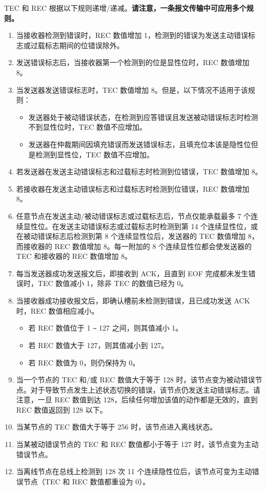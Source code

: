 \documentclass[main\_\_CN.tex]{subfiles}
\begin{document}
TEC 和 REC 根据以下规则递增/递减。\textbf{请注意，一条报文传输中可应用多个规则。}

\begin{enumerate}
    \item 当接收器检测到错误时，REC 数值增加 1，检测到的错误为发送主动错误标志或过载标志期间的位错误除外。
    \item 发送错误标志后，当接收器第一个检测到的位是显性位时，REC 数值增加 8。
    \item 当发送器发送错误标志时，TEC 数值增加 8。但是，以下情况不适用于该规则：
    \begin{itemize}
        \item 发送器处于被动错误状态，在检测到应答错误且发送被动错误标志时检测不到显性位时，TEC 数值不应增加。
        \item 发送器在仲裁期间因填充错误而发送错误标志，且填充位本该是隐性位但是检测到显性位，TEC 数值不应增加。
    \end{itemize}
    \item 若发送器在发送主动错误标志和过载标志时检测到位错误，TEC 数值增加 8。
    \item 若接收器在发送主动错误标志和过载标志时检测到位错误，REC 数值增加 8。
    \item 任意节点在发送主动/被动错误标志或过载标志后，节点仅能承载最多 7 个连续显性位。在发送主动错误标志或过载标志时检测到第 14 个连续显性位，或在被动错误标志后检测到第 8 个连续显性位后，发送器的 TEC 数值增加 8，而接收器的 REC 数值增加 8。每一附加的 8 个连续显性位都会使发送器的 TEC 和接收器的 REC 数值增加 8。
    \item 每当发送器成功发送报文后，即接收到 ACK，且直到 EOF 完成都未发生错误时，TEC 数值减小 1，除非 TEC 的数值已经为 0。
    \item 当接收器成功接收报文后，即确认槽前未检测到错误，且已成功发送 ACK 时，REC 数值相应减小。
    \begin{itemize}
        \item 若 REC 数值位于 1 \verb+~+ 127 之间，则其值减小 1。
        \item 若 REC 数值大于 127，则其值减小到 127。
        \item 若 REC 数值为 0，则仍保持为 0。
    \end{itemize}
    \item 当一个节点的 TEC 和/或 REC 数值大于等于 128 时，该节点变为被动错误节点。对于导致节点发生上述状态切换的错误，该节点仍发送主动错误标志。请注意，一旦 REC 数值到达 128，后续任何增加该值的动作都是无效的，直到 REC 数值返回到 128 以下。
    \item 当某节点的 TEC 数值大于等于 256 时，该节点进入离线状态。
    \item 当某被动错误节点的 TEC 和 REC 数值都小于等于 127 时，该节点变为主动错误节点。
    \item 当离线节点在总线上检测到 128 次 11 个连续隐性位后，该节点可变为主动错误节点（TEC 和 REC 数值都重设为 0）。
\end{enumerate}
\end{document}
